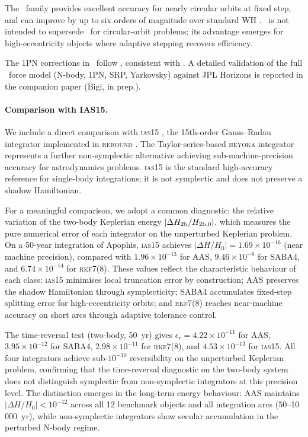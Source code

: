 The \saba\ family \citep{LaskarRobutel2001, Farres2013}
provides excellent accuracy for nearly circular orbits at fixed step,
and can improve by up to six orders of magnitude over standard WH
\citep{ReinHernandezTamayo2019}. \AAS\ is not intended to supersede
\saba\ for circular-orbit problems; its advantage emerges for
high-eccentricity objects where adaptive stepping recovers efficiency.

The 1PN corrections in \AAS\ follow \citet{SahaTremaine1994},
consistent with \orbitn. A detailed validation of the full \astdyn\
force model (N-body, 1PN, SRP, Yarkovsky) against JPL Horizons is
reported in the companion paper (Bigi, in prep.).

\paragraph{Comparison with IAS15.}
We include a direct comparison with \textsc{ias15}
\citep{ReinSpiegel2015}, the 15th-order Gauss--Radau
integrator implemented in \textsc{rebound} \citep{ReinLiu2012}.
The Taylor-series-based \textsc{heyoka} integrator
\citep{Biscani2021heyoka} represents a further non-symplectic
alternative achieving sub-machine-precision accuracy for
astrodynamics problems.
\textsc{ias15} is the standard high-accuracy reference for
single-body integrations; it is not symplectic and does not
preserve a shadow Hamiltonian.

For a meaningful comparison, we adopt a common diagnostic:
the relative variation of the two-body Keplerian energy
$|\Delta H_{\rm 2b}/H_{\rm 2b,0}|$, which measures the
pure numerical error of each integrator on the unperturbed
Keplerian problem. On a 50-year integration of Apophis,
\textsc{ias15} achieves $|\Delta H/H_0| = 1.69\times10^{-16}$
(near machine precision), compared with
$1.96\times10^{-13}$ for AAS,
$9.46\times10^{-8}$ for SABA4, and
$6.74\times10^{-14}$ for \textsc{rkf7(8)}.
These values reflect the characteristic behaviour of each
class: \textsc{ias15} minimises local truncation error
by construction; AAS preserves the shadow Hamiltonian
through symplecticity; SABA4 accumulates fixed-step
splitting error for high-eccentricity orbits; and
\textsc{rkf7(8)} reaches near-machine accuracy on short
arcs through adaptive tolerance control.

The time-reversal test (two-body, 50~yr) gives
$\epsilon_r = 4.22\times10^{-11}$ for AAS,
$3.95\times10^{-12}$ for SABA4,
$2.98\times10^{-11}$ for \textsc{rkf7(8)}, and
$4.53\times10^{-13}$ for \textsc{ias15}.
All four integrators achieve sub-$10^{-10}$ reversibility
on the unperturbed Keplerian problem, confirming that
the time-reversal diagnostic on the two-body system does
not distinguish symplectic from non-symplectic integrators
at this precision level. The distinction emerges in the
long-term energy behaviour: AAS maintains
$|\Delta H/H_0| < 10^{-12}$ across all 12 benchmark objects
and all integration arcs (50--10\,000~yr), while non-symplectic
integrators show secular accumulation in the perturbed
N-body regime.

